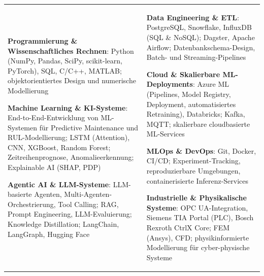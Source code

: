 {\scriptsize
\begin{tabularx}{\textwidth}{@{}X X@{}}

\begin{minipage}[t]{\linewidth}

\textbf{\textcolor{linksoft}{Programmierung \& Wissenschaftliches Rechnen}}: 
Python (NumPy, Pandas, SciPy, scikit-learn, PyTorch), SQL, C/C++, MATLAB; 
objektorientiertes Design und numerische Modellierung 
\par\vspace{0.5em}

\textbf{\textcolor{linksoft}{Machine Learning \& KI-Systeme}}: 
End-to-End-Entwicklung von ML-Systemen für Predictive Maintenance und RUL-Modellierung; 
LSTM (Attention), CNN, XGBoost, Random Forest; 
Zeitreihenprognose, Anomalieerkennung; 
Explainable AI (SHAP, PDP) 
\par\vspace{0.5em}

\textbf{\textcolor{linksoft}{Agentic AI \& LLM-Systeme}}: 
LLM-basierte Agenten, Multi-Agenten-Orchestrierung, Tool Calling; 
RAG, Prompt Engineering, LLM-Evaluierung; 
Knowledge Distillation; LangChain, LangGraph, Hugging Face 

\end{minipage}
&
\begin{minipage}[t]{\linewidth}

\textbf{\textcolor{linksoft}{Data Engineering \& ETL}}: 
PostgreSQL, Snowflake, InfluxDB (SQL \& NoSQL); 
Dagster, Apache Airflow; 
Datenbankschema-Design, Batch- und Streaming-Pipelines
\par\vspace{0.5em}

\textbf{\textcolor{linksoft}{Cloud \& Skalierbare ML-Deployments}}: 
Azure ML (Pipelines, Model Registry, Deployment, automatisiertes Retraining), 
Databricks; Kafka, MQTT; skalierbare cloudbasierte ML-Services 
\par\vspace{0.5em}

\textbf{\textcolor{linksoft}{MLOps \& DevOps}}: 
Git, Docker, CI/CD; Experiment-Tracking, 
reproduzierbare Umgebungen, containerisierte Inferenz-Services 
\par\vspace{0.5em}

\textbf{\textcolor{linksoft}{Industrielle \& Physikalische Systeme}}: 
OPC UA-Integration, Siemens TIA Portal (PLC), 
Bosch Rexroth CtrlX Core; 
FEM (Ansys), CFD; physikinformierte Modellierung 
für cyber-physische Systeme

\end{minipage}
\\
\end{tabularx}
}
